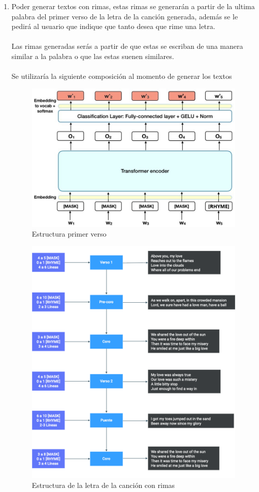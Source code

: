 \documentclass[12pt, a4paper, titlepage]{report}
\begin{document}
\begin{enumerate}
\item Poder generar textos con rimas, estas rimas se generarán a partir de la ultima palabra del primer verso de la letra de la canción generada, además se le pedirá al usuario que indique que tanto desea que rime una letra.\\\\
Las rimas generadas serás a partir de que estas se escriban de una manera similar a la palabra o que las estas suenen similares.\\\\
Se utilizaría la siguiente composición al momento de generar los textos
\begin{figure}[H]
	\includegraphics[width=12cm]{./imagenes/TrabajoFuturo/bert_output_model_rhyme.jpg}
	\centering 
	\caption{Estructura primer verso}
\end{figure}
\begin{figure}[H]
	\includegraphics[width=12cm]{./imagenes/TrabajoFuturo/Generacion_letras_rima.png}
	\centering 
	\caption{Estructura de la letra de la canción con rimas}
\end{figure}


\end{enumerate}
\end{document}
